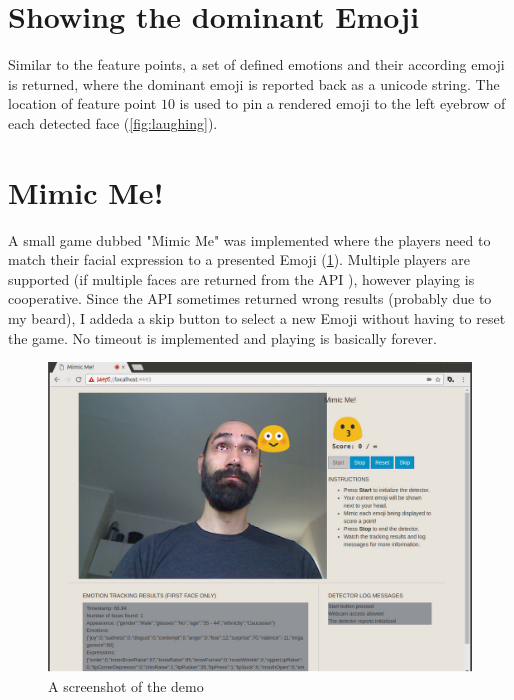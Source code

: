 \documentclass[12pt, a4paper, oneside]{article}
\begin{document}
\section{Showing the dominant Emoji}

Similar to the feature points, a set of defined emotions and their according emoji is returned,
where the dominant emoji is reported back as a unicode string.
The location of feature point $10$ is used to pin a rendered emoji to the left eyebrow of
each detected face (\cref{fig:laughing}).

\section{Mimic Me!}

A small game dubbed "Mimic Me" was implemented where the players need to match their
facial expression to a presented Emoji (\cref{fig:screenshot}).
Multiple players are supported (if multiple faces are returned from the API \cite{affectiva:analyze}),
however playing is cooperative.
Since the API sometimes returned wrong results (probably due to my beard), I addeda a skip button 
to select a new Emoji without having to reset the game.
No timeout is implemented and playing is basically forever.

\begin{figure}
  \centering
  \includegraphics[width=\textwidth]{images/page}
  \caption{A screenshot of the demo}
  \label{fig:screenshot}
 \end{figure}

 \printbibliography 
\end{document}
